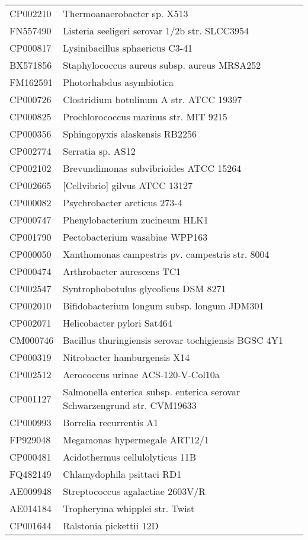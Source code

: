 \begin{longtable}{ll}
CP002210 & Thermoanaerobacter sp. X513\\
FN557490 & Listeria seeligeri serovar 1/2b str. SLCC3954\\
CP000817 & Lysinibacillus sphaericus C3-41\\
BX571856 & Staphylococcus aureus subsp. aureus MRSA252\\
FM162591 & Photorhabdus asymbiotica\\
CP000726 & Clostridium botulinum A str. ATCC 19397\\
CP000825 & Prochlorococcus marinus str. MIT 9215\\
CP000356 & Sphingopyxis alaskensis RB2256\\
CP002774 & Serratia sp. AS12\\
CP002102 & Brevundimonas subvibrioides ATCC 15264\\
CP002665 & [Cellvibrio] gilvus ATCC 13127\\
CP000082 & Psychrobacter arcticus 273-4\\
CP000747 & Phenylobacterium zucineum HLK1\\
CP001790 & Pectobacterium wasabiae WPP163\\
CP000050 & Xanthomonas campestris pv. campestris str. 8004\\
CP000474 & Arthrobacter aurescens TC1\\
CP002547 & Syntrophobotulus glycolicus DSM 8271\\
CP002010 & Bifidobacterium longum subsp. longum JDM301\\
CP002071 & Helicobacter pylori Sat464\\
CM000746 & Bacillus thuringiensis serovar tochigiensis BGSC 4Y1\\
CP000319 & Nitrobacter hamburgensis X14\\
CP002512 & Aerococcus urinae ACS-120-V-Col10a\\
CP001127 & Salmonella enterica subsp. enterica serovar Schwarzengrund str. CVM19633\\
CP000993 & Borrelia recurrentis A1\\
FP929048 & Megamonas hypermegale ART12/1\\
CP000481 & Acidothermus cellulolyticus 11B\\
FQ482149 & Chlamydophila psittaci RD1\\
AE009948 & Streptococcus agalactiae 2603V/R\\
AE014184 & Tropheryma whipplei str. Twist\\
CP001644 & Ralstonia pickettii 12D\\

\end{longtable}
